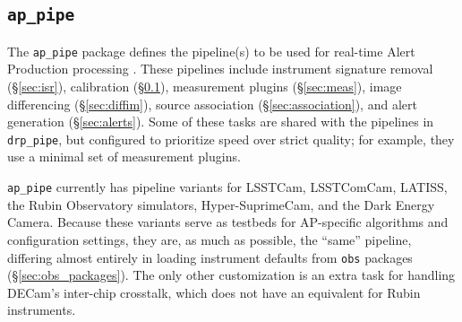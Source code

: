 \subsection{\texttt{ap\_pipe}}

The \texttt{ap\_pipe} package defines the pipeline(s) to be used for real-time Alert Production processing \citep{DMTN-219}.
These pipelines include instrument signature removal (\S\ref{sec:isr}), calibration (\S\ref{}), measurement plugins (\S\ref{sec:meas}), image differencing (\S\ref{sec:diffim}), source association (\S\ref{sec:association}), and alert generation (\S\ref{sec:alerts}).
Some of these tasks are shared with the pipelines in \texttt{drp\_pipe}, but configured to prioritize speed over strict quality; for example, they use a minimal set of measurement plugins.

\texttt{ap\_pipe} currently has pipeline variants for LSSTCam, LSSTComCam, LATISS, the Rubin Observatory simulators, Hyper-SuprimeCam, and the Dark Energy Camera.
Because these variants serve as testbeds for AP-specific algorithms and configuration settings, they are, as much as possible, the ``same'' pipeline, differing almost entirely in loading instrument defaults from \texttt{obs} packages (\S\ref{sec:obs_packages}).
The only other customization is an extra task for handling DECam's inter-chip crosstalk, which does not have an equivalent for Rubin instruments.
